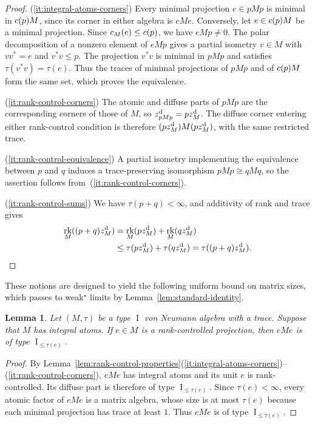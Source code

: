 \documentclass[11pt]{amsart}
\makeatletter
\numberwithin{equation}{section}
\DeclareMathOperator{\I}{I}
\DeclareMathOperator{\rk}{rk}
\newcommand{\@optsub}[1]{\if\relax\detokenize{#1}\relax\else_{#1}\fi}
\newcommand{\csupp}[2][]{c\@optsub{#1}(#2)}
\newcommand{\zdiff}[1][]{z^{\mathrm{d}}\@optsub{#1}}
\newtheorem{Lem}[The]{Lemma}
\theoremstyle{definition}
\makeatother
\begin{document}
\begin{proof}
    \textup{(\ref*{it:integral-atoms-corners})} Every minimal projection $e\in pMp$ is minimal in $\csupp{p}M$, since its corner in either algebra is $eMe$. Conversely, let $e\in\csupp{p}M$ be a minimal projection. Since $\csupp[M]{e}\leq\csupp{p}$, we have $eMp\ne0$. The polar decomposition of a nonzero element of $eMp$ gives a partial isometry $v\in M$ with $vv^*=e$ and $v^*v\leq p$. The projection $v^*v$ is minimal in $pMp$ and satisfies $\tau(v^*v)=\tau(e)$. Thus the traces of minimal projections of $pMp$ and of $\csupp{p}M$ form the same set, which proves the equivalence.

    \textup{(\ref*{it:rank-control-corners})} The atomic and diffuse parts of $pMp$ are the corresponding corners of those of $M$, so $\zdiff[pMp]=p\zdiff[M]$. The diffuse corner entering either rank-control condition is therefore $(p\zdiff[M])M(p\zdiff[M])$, with the same restricted trace.

    \textup{(\ref*{it:rank-control-equivalence})} A partial isometry implementing the equivalence between $p$ and $q$ induces a trace-preserving isomorphism $pMp\cong qMq$, so the assertion follows from~\textup{(\ref*{it:rank-control-corners})}.

    \textup{(\ref*{it:rank-control-sums})} We have $\tau(p+q)<\infty$, and additivity of rank and trace gives
    \begin{align*}
            \rk_M((p+q)\zdiff[M])
            &=\rk_M(p\zdiff[M])+\rk_M(q\zdiff[M])\\
            &\leq\tau(p\zdiff[M])+\tau(q\zdiff[M])
            =\tau((p+q)\zdiff[M]).\qedhere
    \end{align*}
\end{proof}

These notions are designed to yield the following uniform bound on matrix sizes, which passes to weak$^\star$ limits by Lemma~\ref{lem:standard-identity}.

\begin{Lem}
    \label{lem:rank-controlled}
    Let $(M,\tau)$ be a type $\I$ von Neumann algebra with a trace. Suppose that $M$ has integral atoms. If $e\in M$ is a rank-controlled projection, then $eMe$ is of type $\I_{\leq\tau(e)}$.
\end{Lem}

\begin{proof}
    By Lemma~\ref{lem:rank-control-properties}\textup{(\ref*{it:integral-atoms-corners})--(\ref*{it:rank-control-corners})}, $eMe$ has integral atoms and its unit $e$ is rank-controlled. Its diffuse part is therefore of type $\I_{\leq\tau(e)}$. Since $\tau(e)<\infty$, every atomic factor of $eMe$ is a matrix algebra, whose size is at most $\tau(e)$ because each minimal projection has trace at least $1$. Thus $eMe$ is of type $\I_{\leq\tau(e)}$.
\end{proof}
\end{document}
